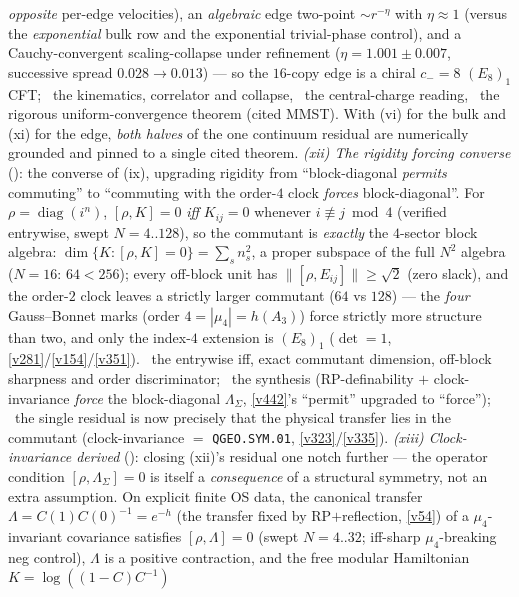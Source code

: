 \documentclass[11pt,a4paper]{article}
\begin{document}
\begin{keybox}
\emph{opposite} per-edge velocities), an \emph{algebraic} edge two-point $\sim r^{-\eta}$ with $\eta{\approx}1$
(versus the \emph{exponential} bulk row and the exponential trivial-phase control), and a Cauchy-convergent
scaling-collapse under refinement ($\eta{=}1.001{\pm}0.007$, successive spread $0.028{\to}0.013$) --- so the
$16$-copy edge is a chiral $c_-{=}8$ $(E_8)_1$ CFT; \mE\ the kinematics, correlator and collapse, \mC\ the
central-charge reading, \mO\ the rigorous uniform-convergence theorem (cited MMST). With (vi) for the bulk and
(xi) for the edge, \emph{both halves} of the one continuum residual are numerically grounded and pinned to a single
cited theorem. \emph{(xii) The rigidity forcing converse} (): the converse
of (ix), upgrading rigidity from ``block-diagonal \emph{permits} commuting'' to ``commuting with the order-$4$
clock \emph{forces} block-diagonal''. For $\rho{=}\operatorname{diag}(i^n)$, $[\rho,K]{=}0$ \emph{iff}
$K_{ij}{=}0$ whenever $i{\not\equiv}j\bmod4$ (verified entrywise, swept $N{=}4..128$), so the commutant is
\emph{exactly} the $4$-sector block algebra: $\dim\{K:[\rho,K]{=}0\}{=}\sum_s n_s^2$, a proper subspace of the
full $N^2$ algebra ($N{=}16$: $64{<}256$); every off-block unit has $\|[\rho,E_{ij}]\|{\ge}\sqrt2$ (zero slack),
and the order-$2$ clock leaves a strictly larger commutant ($64$ vs $128$) --- the \emph{four} Gauss--Bonnet marks
(order $4{=}|\mu_4|{=}h(A_3)$) force strictly more structure than two, and only the index-$4$ extension is $(E_8)_1$
($\det{=}1$, \vref{v281}/\vref{v154}/\vref{v351}). \mE\ the entrywise iff, exact commutant dimension, off-block
sharpness and order discriminator; \mC\ the synthesis (RP-definability $+$ clock-invariance \emph{force} the
block-diagonal $\Lambda_\Sigma$, \vref{v442}'s ``permit'' upgraded to ``force''); \mO\ the single residual is now
precisely that the physical transfer lies in the commutant (clock-invariance $=$ \texttt{QGEO.SYM.01},
\vref{v323}/\vref{v335}). \emph{(xiii) Clock-invariance derived} (): closing
(xii)'s residual one notch further --- the operator condition $[\rho,\Lambda_\Sigma]{=}0$ is itself a
\emph{consequence} of a structural symmetry, not an extra assumption. On explicit finite OS data, the canonical
transfer $\Lambda{=}C(1)C(0)^{-1}{=}e^{-h}$ (the transfer fixed by RP$+$reflection, \vref{v54}) of a
$\mu_4$-invariant covariance satisfies $[\rho,\Lambda]{=}0$ (swept $N{=}4..32$; iff-sharp $\mu_4$-breaking neg
control), $\Lambda$ is a positive contraction, and the free modular Hamiltonian $K{=}\log((1{-}C)C^{-1})$

\end{keybox}
\end{document}
